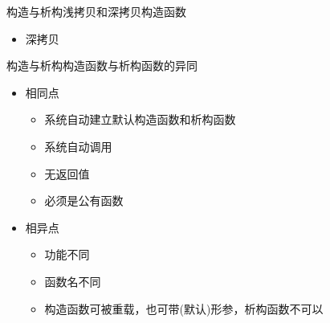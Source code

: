 \begin{frame}[t, fragile]{构造与析构}{浅拷贝和深拷贝构造函数}%
  \begin{itemize}
  \item 深拷贝
  \end{itemize}
  \hspace{6em}
  \begin{center}
    \begin{minipage}{0.46\linewidth}
    \end{minipage}\quad
    \begin{minipage}{0.4\linewidth}
    \end{minipage}
  \end{center}
\end{frame}

\begin{frame}[t, fragile]{构造与析构}{构造函数与析构函数的异同}%
  \stretchon
  \begin{itemize}
  \item 相同点
    \begin{itemize}
    \item 系统自动建立默认构造函数和析构函数
    \item 系统自动调用
    \item 无返回值
    \item 必须是公有函数
    \end{itemize}
  \item 相异点
    \begin{itemize}
    \item 功能不同
    \item 函数名不同
    \item 构造函数可被重载，也可带(默认)形参，析构函数不可以
    \end{itemize}
  \end{itemize}
  \stretchoff
\end{frame}


